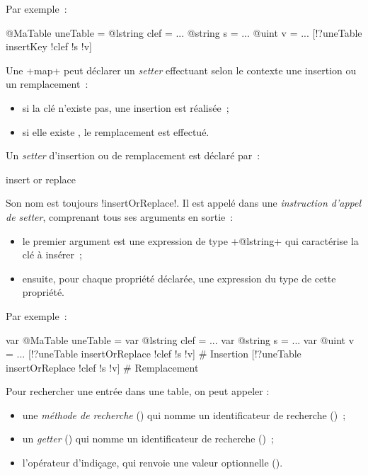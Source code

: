 Par exemple~:
\begin{galgas3}
@MaTable uneTable = {}
@lstring clef = ...
@string s = ...
@uint v = ...
[!?uneTable insertKey !clef !s !v]
\end{galgas3}




Une \ggsq+map+ peut déclarer un \emph{setter} effectuant selon le contexte une insertion ou un remplacement~:
\begin{itemize}
  \item si la clé n'existe pas, une insertion est réalisée~;
  \item si elle existe , le remplacement est effectué.
\end{itemize}

Un \emph{setter} d'insertion ou de remplacement est déclaré par~:

\begin{galgas3}
insert or replace
\end{galgas3}

\begin{galgas4}
\end{galgas4}

Son nom est toujours \ggsq!insertOrReplace!. Il est appelé dans une \emph{instruction d'appel de setter}, comprenant tous ses arguments en sortie~:
\begin{itemize}
  \item le premier argument est une expression de type \ggsq+@lstring+ qui caractérise la clé à insérer~;
  \item ensuite, pour chaque propriété déclarée, une expression du type de cette propriété.
\end{itemize}

Par exemple~:
\begin{galgas3}
var @MaTable uneTable = {}
var @lstring clef = ...
var @string s = ...
var @uint v = ...
[!?uneTable insertOrReplace !clef !s !v] # Insertion
[!?uneTable insertOrReplace !clef !s !v] # Remplacement
\end{galgas3}









Pour rechercher une entrée dans une table, on peut appeler :
\begin{itemize}
  \item une \emph{méthode de recherche} () qui nomme un identificateur de recherche ()~;
  \item un \emph{getter} () qui nomme un identificateur de recherche ()~;
  \item l'opérateur d'indiçage, qui renvoie une valeur optionnelle ().
\end{itemize}


